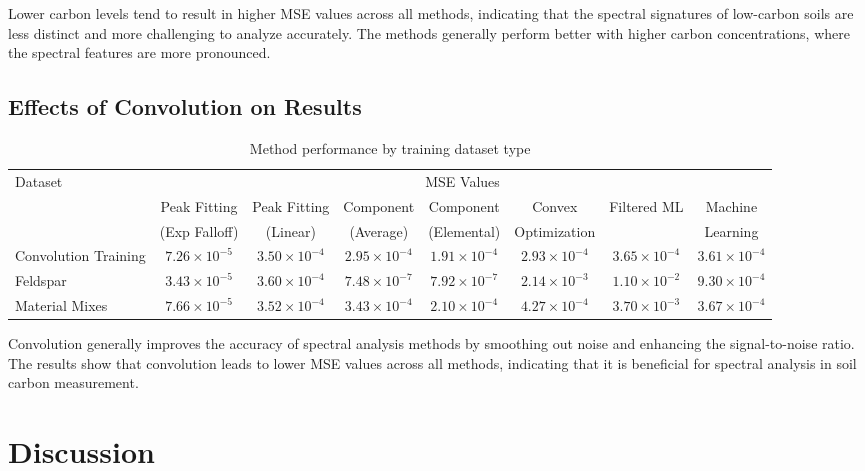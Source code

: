 \documentclass[review]{elsarticle}
\begin{document}
Lower carbon levels tend to result in higher MSE values across all methods, indicating that the spectral signatures of low-carbon soils are less distinct and more challenging to analyze accurately. The methods generally perform better with higher carbon concentrations, where the spectral features are more pronounced.

\subsection{Effects of Convolution on Results}

\begin{table}[H]
\centering
\caption{Method performance by training dataset type}
\label{tab:convolution_effects}
\begin{tabular}{lccccccc}
\toprule
Dataset & \multicolumn{7}{c}{MSE Values} \\
\cmidrule(lr){2-8}
& Peak Fitting & Peak Fitting & Component & Component & Convex & Filtered ML & Machine \\
& (Exp Falloff) & (Linear) & (Average) & (Elemental) & Optimization & & Learning \\
\midrule
Convolution Training & $7.26 \times 10^{-5}$ & $3.50 \times 10^{-4}$ & $2.95 \times 10^{-4}$ & $1.91 \times 10^{-4}$ & $2.93 \times 10^{-4}$ & $3.65 \times 10^{-4}$ & $3.61 \times 10^{-4}$ \\
Feldspar & $3.43 \times 10^{-5}$ & $3.60 \times 10^{-4}$ & $7.48 \times 10^{-7}$ & $7.92 \times 10^{-7}$ & $2.14 \times 10^{-3}$ & $1.10 \times 10^{-2}$ & $9.30 \times 10^{-4}$ \\
Material Mixes & $7.66 \times 10^{-5}$ & $3.52 \times 10^{-4}$ & $3.43 \times 10^{-4}$ & $2.10 \times 10^{-4}$ & $4.27 \times 10^{-4}$ & $3.70 \times 10^{-3}$ & $3.67 \times 10^{-4}$ \\
\bottomrule
\end{tabular}
\end{table}

Convolution generally improves the accuracy of spectral analysis methods by smoothing out noise and enhancing the signal-to-noise ratio. The results show that convolution leads to lower MSE values across all methods, indicating that it is beneficial for spectral analysis in soil carbon measurement.

\section{Discussion}
\end{document}
